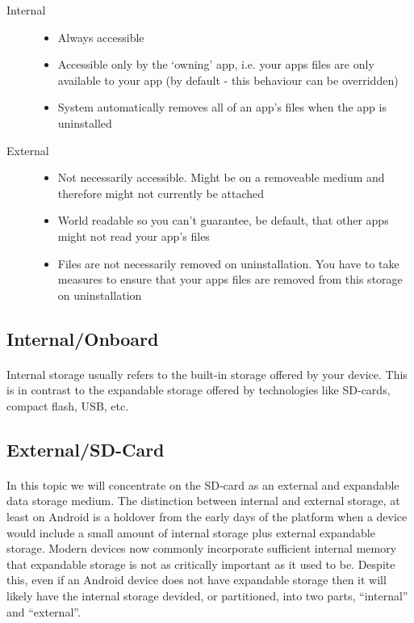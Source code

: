\begin{description}
\item[Internal]
    \begin{itemize}
    \item Always accessible
    \item Accessible only by the `owning' app, i.e. your apps files are only available to your app (by default - this behaviour can be overridden)
    \item System automatically removes all of an app's files when the app is uninstalled
    \end{itemize}
\item[External] 
    \begin{itemize}
    \item Not necessarily accessible. Might be on a removeable medium and therefore might not currently be attached
    \item World readable so you can't guarantee, be default, that other apps might not read your app's files
    \item Files are not necessarily removed on uninstallation. You have to take measures to ensure that your apps files are removed from this storage on uninstallation
    \end{itemize}
\end{description}

\subsection{Internal/Onboard}
\paragraph{} Internal storage usually refers to the built-in storage offered by your device. This is in contrast to the expandable storage offered by technologies like SD-cards, compact flash, USB, etc. 

\subsection{External/SD-Card}
\paragraph{} In this topic we will concentrate on the SD-card as an external and expandable data storage medium. The distinction between internal and external storage, at least on Android is a holdover from the early days of the platform when a device would include a small amount of internal storage plus external expandable storage. Modern devices now commonly incorporate sufficient internal memory that expandable storage is not as critically important as it used to be. Despite this, even if an Android device does not have expandable storage then it will likely have the internal storage devided, or partitioned, into two parts, ``internal'' and ``external''.

